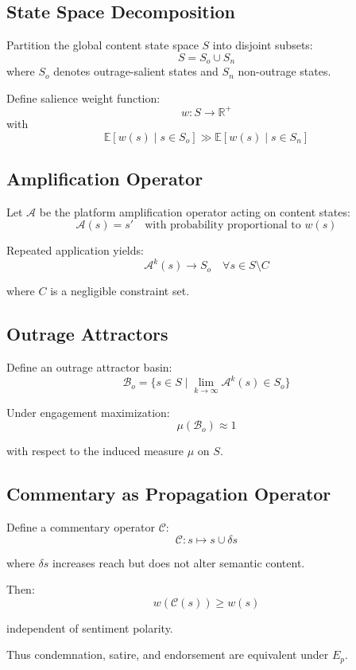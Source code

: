 \documentclass[12pt]{article}
\begin{document}
\subsection{State Space Decomposition}

Partition the global content state space $S$ into disjoint subsets:
\[
S = S_o \cup S_n
\]
where $S_o$ denotes outrage-salient states and $S_n$ non-outrage states.

Define salience weight function:
\[
w : S \to \mathbb{R}^+
\]
with
\[
\mathbb{E}[w(s) \mid s \in S_o] \gg \mathbb{E}[w(s) \mid s \in S_n]
\]

\subsection{Amplification Operator}

Let $\mathcal{A}$ be the platform amplification operator acting on content states:
\[
\mathcal{A}(s) = s' \quad \text{with probability proportional to } w(s)
\]

Repeated application yields:
\[
\mathcal{A}^k(s) \to S_o \quad \forall s \in S \setminus C
\]

where $C$ is a negligible constraint set.

\subsection{Outrage Attractors}

Define an outrage attractor basin:
\[
\mathcal{B}_o = \{ s \in S \mid \lim_{k \to \infty} \mathcal{A}^k(s) \in S_o \}
\]

Under engagement maximization:
\[
\mu(\mathcal{B}_o) \approx 1
\]

with respect to the induced measure $\mu$ on $S$.

\subsection{Commentary as Propagation Operator}

Define a commentary operator $\mathcal{C}$:
\[
\mathcal{C}: s \mapsto s \cup \delta s
\]

where $\delta s$ increases reach but does not alter semantic content.

Then:
\[
w(\mathcal{C}(s)) \geq w(s)
\]

independent of sentiment polarity.

Thus condemnation, satire, and endorsement are equivalent under $E_p$.
\end{document}
